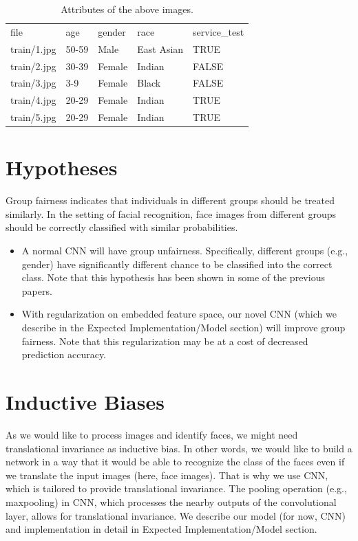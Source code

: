 \documentclass{article}
\begin{document}
\begin{table}[H]
\centering
\caption{Attributes of the above images.}
\begin{tabular}{lllll}
file & age & gender & race & service\_test \\
train/1.jpg & 50-59 & Male & East Asian & TRUE \\
train/2.jpg & 30-39 & Female & Indian & FALSE\\
train/3.jpg & 3-9 & Female & Black & FALSE  \\
train/4.jpg & 20-29 & Female & Indian & TRUE\\
train/5.jpg & 20-29 & Female & Indian & TRUE        
\end{tabular}
\end{table}


\section{Hypotheses}

Group fairness indicates that individuals in different groups should be treated similarly. In the setting of facial recognition, face images from different groups should be correctly classified with similar probabilities. 
\begin{itemize}
\item A normal CNN will have group unfairness.  Specifically, different groups (e.g., gender) have significantly different chance to be classified into the correct class.  Note that this hypothesis has been shown in some of the previous papers. \cite{abdurrahim2017review} \cite{michalsky2019fair} \cite{buolamwini2018gendershades}
\item With regularization on embedded feature space, our novel CNN (which we describe in the Expected Implementation/Model section) will improve group fairness. Note that this regularization may be at a cost of decreased prediction accuracy.   
\end{itemize}


\section{Inductive Biases}
As we would like to process images and identify faces, we might need translational invariance as inductive bias. In other words, we would like to build a network in a way that it would be able to recognize the class of the faces even if we translate the input images (here, face images). That is why we use CNN, which is tailored to provide translational invariance. The pooling operation (e.g., maxpooling) in CNN, which processes the nearby outputs of the convolutional layer, allows for translational invariance.   We describe our model (for now, CNN) and implementation in detail in Expected Implementation/Model section.
\end{document}
